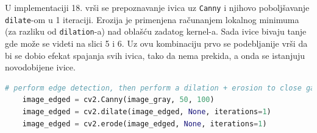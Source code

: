 \documentclass[fontsize=12bp, paper=a4]{scrarticle}
\begin{document}
U implementaciji 18. vrši se prepoznavanje ivica uz \verb|Canny| i njihovo poboljšavanje \verb|dilate|-om u 1 iteraciji. Erozija je primenjena računanjem lokalnog minimuma (za razliku od \texttt{dilation}-a) nad oblašću zadatog kernel-a. Sada ivice bivaju tanje gde može se videti na slici 5 i 6. Uz ovu kombinaciju prvo se podebljanije vrši da bi se dobio efekat spajanja svih ivica, tako da nema prekida, a onda se istanjuju novodobijene ivice.

\begin{lstlisting}[language=Python, caption={Detekcija ivica i njihova obrada}]
    # perform edge detection, then perform a dilation + erosion to close gaps in between object edges
    image_edged = cv2.Canny(image_gray, 50, 100)
    image_edged = cv2.dilate(image_edged, None, iterations=1)
    image_edged = cv2.erode(image_edged, None, iterations=1)
\end{lstlisting} 
\end{document}
